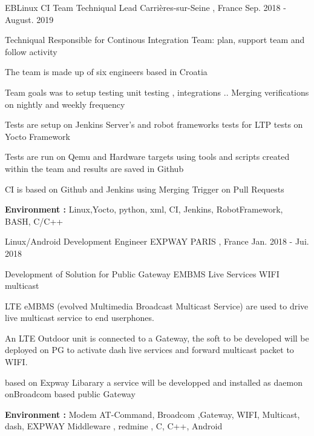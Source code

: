 \documentclass[11pt, a4paper]{awesome-cv} %
\begin{document}
\begin{cventries}
    \cventry
    {EBLinux CI Team Techniqual Lead} %
    {} %
    {Carrières-sur-Seine , France} %
    {Sep. 2018 - August. 2019} %
    { %
        \begin{cvitems}
            \item {Techniqual Responsible for Continous Integration Team: plan, support team and follow activity}
            \item {The team is made up of six engineers based in Croatia }
            \item {Team goals was to setup testing unit testing , integrations .. Merging verifications on nightly and weekly frequency}
            \item {Tests are setup on Jenkins Server's and robot frameworks tests for LTP tests on Yocto Framework}
            \item {Tests are run on Qemu and Hardware targets using tools and scripts created within the team and results are saved in Github}
            \item {CI is based on Github and Jenkins using Merging Trigger on Pull Requests}
            \item { \textbf{Environment :} Linux,Yocto, python, xml, CI, Jenkins, RobotFramework, BASH, C/C++}
        \end{cvitems}
    }


    \cventry
    {Linux/Android Development Engineer } %
    {EXPWAY} %
    {PARIS , France} %
    {Jan. 2018 - Jui. 2018} %
    { %
        \begin{cvitems}
            \item {Development of Solution for Public Gateway EMBMS Live Services WIFI multicast}
            \item {LTE eMBMS (evolved Multimedia Broadcast Multicast Service) are used to drive live multicast service to end userphones.}
            \item { An LTE  Outdoor unit is connected to a Gateway, the soft to be developed will be deployed on PG to activate dash live services and forward multicast packet to WIFI.}
            \item {based on Expway Libarary a service will be developped and installed as daemon onBroadcom based public Gateway}
            \item { \textbf{Environment :} Modem AT-Command, Broadcom ,Gateway, WIFI, Multicast, dash, EXPWAY Middleware , redmine , C, C++, Android}
        \end{cvitems}
    }



\end{cventries}
\end{document}
